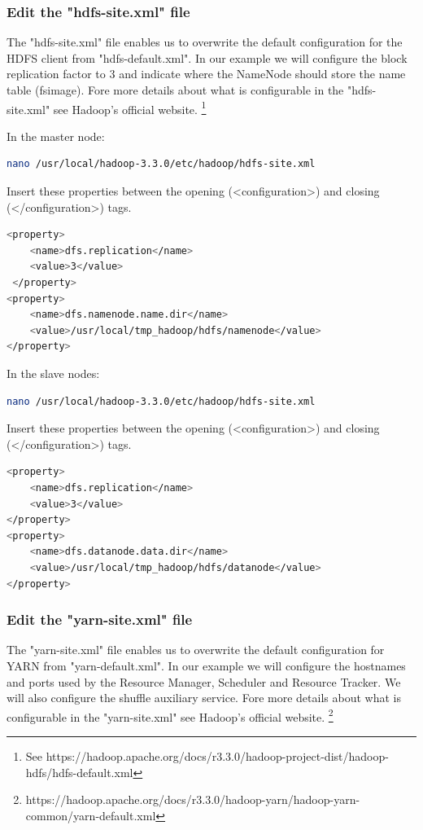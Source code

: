 \documentclass[12pt,english]{book}
\begin{document}
\subsubsection{Edit the "hdfs-site.xml" file}


The "hdfs-site.xml" file enables us to overwrite the default configuration for the HDFS client from "hdfs-default.xml".
In our example we will configure the block replication factor to 3 and indicate where the NameNode should store the name table (fsimage).
Fore more details about what is configurable in the "hdfs-site.xml" see Hadoop's official website.
\footnote{See https://hadoop.apache.org/docs/r3.3.0/hadoop-project-dist/hadoop-hdfs/hdfs-default.xml}

In the master node:
\begin{lstlisting}[language=bash, frame=single]
nano /usr/local/hadoop-3.3.0/etc/hadoop/hdfs-site.xml 
\end{lstlisting}
Insert these properties between the opening (<configuration>) and closing (</configuration>) tags. 
\begin{lstlisting}[language=bash, frame=single]
<property>
	<name>dfs.replication</name>
	<value>3</value>
 </property>
<property>
	<name>dfs.namenode.name.dir</name>
	<value>/usr/local/tmp_hadoop/hdfs/namenode</value>
</property>
\end{lstlisting}

In the slave nodes:
\begin{lstlisting}[language=bash, frame=single]
nano /usr/local/hadoop-3.3.0/etc/hadoop/hdfs-site.xml 
\end{lstlisting}
Insert these properties between the opening (<configuration>) and closing (</configuration>) tags.
\begin{lstlisting}[language=bash, frame=single]
<property>
	<name>dfs.replication</name>
	<value>3</value>
</property>
<property>
	<name>dfs.datanode.data.dir</name>
	<value>/usr/local/tmp_hadoop/hdfs/datanode</value>
</property>
\end{lstlisting}


\subsubsection{Edit the "yarn-site.xml" file}


The "yarn-site.xml" file enables us to overwrite the default configuration for YARN from "yarn-default.xml".
In our example we will configure the hostnames and ports used by the Resource Manager, Scheduler and Resource Tracker.
We will also configure the shuffle auxiliary service.
Fore more details about what is configurable in the "yarn-site.xml" see Hadoop's official website.
\footnote{https://hadoop.apache.org/docs/r3.3.0/hadoop-yarn/hadoop-yarn-common/yarn-default.xml}
\end{document}
